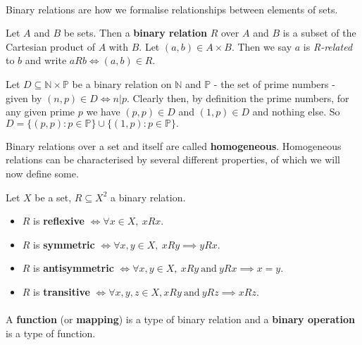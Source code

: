 \documentclass[../abstract_algebra.tex]{subfiles}
\begin{document}
        \paragraph{}
        Binary relations are how we formalise relationships between elements of sets.
        \begin{definition}
            Let $A$ and $B$ be sets. Then a \textbf{binary relation} $R$ over $A$ and $B$ is a subset of the Cartesian product of $A$ with $B$. Let $(a, b) \in A \times B$. Then we say $a$ is \textit{R-related} to $b$ and write $aRb \iff (a, b) \in R$. 
        \end{definition}
        \begin{example}
            Let $D \subseteq \mathbb{N} \times \mathbb{P}$ be a binary relation on $\mathbb{N}$ and $\mathbb{P}$ - the set of prime numbers - given by $(n, p) \in D \iff n|p$. Clearly then, by definition the prime numbers, for any given prime $p$ we have $(p, p) \in D$ and $(1, p) \in D$ and nothing else. So $D = \{(p, p): p \in \mathbb{P}\} \cup \{(1, p): p \in \mathbb{P}\}.$
        \end{example}
        Binary relations over a set and itself are called \textbf{homogeneous}. 
        Homogeneous relations can be characterised by several different properties, of which we will now define some.
        \begin{definition}\label{homogeneous-relation-types}
            Let $X$ be a set, $R \subseteq X^2$ a binary relation.
            \begin{itemize}
                \item $R$ is \textbf{reflexive} $\iff \forall x \in X,\  xRx$.
                \item $R$ is \textbf{symmetric} $\iff \forall x, y \in X,\ xRy \implies yRx$.
                \item $R$ is \textbf{antisymmetric} $\iff \forall x, y \in X,\ xRy\ \text{and}\ yRx \implies x=y$.
                \item $R$ is \textbf{transitive} $\iff \forall x, y, z \in X, xRy\ \text{and}\ yRz \implies xRz$.
            \end{itemize}
        \end{definition}
        
        \paragraph{}
        A \textbf{function} (or \textbf{mapping}) is a type of binary relation and a \textbf{binary operation} is a type of function.
\end{document}
